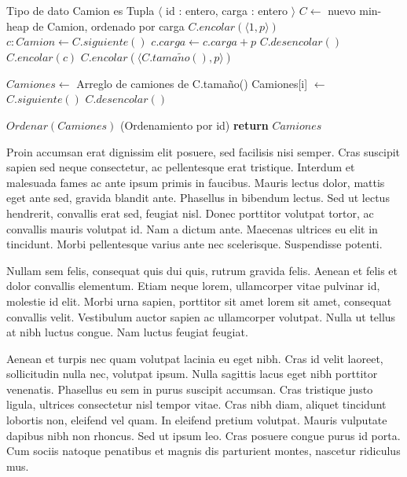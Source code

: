 \begin{pseudo}
\State Tipo de dato Camion es Tupla $\langle$ id : entero, carga : entero $\rangle$
        \State $C \leftarrow$ nuevo min-heap de Camion, ordenado por carga 
             
                \State $C.encolar(\langle 1 , p \rangle)$ 
             
                \State $c : Camion \leftarrow C.siguiente()$ 
                \State $c.carga \leftarrow c.carga + p$ 
                \State $C.desencolar()$ 
                \State $C.encolar(c)$ 
            \Else
                \State $C.encolar(\langle C.tama\tilde{n}o(), p \rangle)$ 
            \EndIf
        \EndFor

   \State $Camiones \leftarrow$ Arreglo de camiones de C.tamaño()
       \State Camiones[i] $\leftarrow$ $C.siguiente()$  
       \State $C.desencolar()$  
        \EndFor
        
        \State $Ordenar(Camiones)$ (Ordenamiento por id) 
        \State \textbf{return} $Camiones$
    \EndProcedure
\end{pseudo}

Proin accumsan erat dignissim elit posuere, sed facilisis nisi semper. Cras suscipit sapien sed neque consectetur, ac pellentesque erat tristique. Interdum et malesuada fames ac ante ipsum primis in faucibus. Mauris lectus dolor, mattis eget ante sed, gravida blandit ante. Phasellus in bibendum lectus. Sed ut lectus hendrerit, convallis erat sed, feugiat nisl. Donec porttitor volutpat tortor, ac convallis mauris volutpat id. Nam a dictum ante. Maecenas ultrices eu elit in tincidunt. Morbi pellentesque varius ante nec scelerisque. Suspendisse potenti.

Nullam sem felis, consequat quis dui quis, rutrum gravida felis. Aenean et felis et dolor convallis elementum. Etiam neque lorem, ullamcorper vitae pulvinar id, molestie id elit. Morbi urna sapien, porttitor sit amet lorem sit amet, consequat convallis velit. Vestibulum auctor sapien ac ullamcorper volutpat. Nulla ut tellus at nibh luctus congue. Nam luctus feugiat feugiat.

Aenean et turpis nec quam volutpat lacinia eu eget nibh. Cras id velit laoreet, sollicitudin nulla nec, volutpat ipsum. Nulla sagittis lacus eget nibh porttitor venenatis. Phasellus eu sem in purus suscipit accumsan. Cras tristique justo ligula, ultrices consectetur nisl tempor vitae. Cras nibh diam, aliquet tincidunt lobortis non, eleifend vel quam. In eleifend pretium volutpat. Mauris vulputate dapibus nibh non rhoncus. Sed ut ipsum leo. Cras posuere congue purus id porta. Cum sociis natoque penatibus et magnis dis parturient montes, nascetur ridiculus mus.